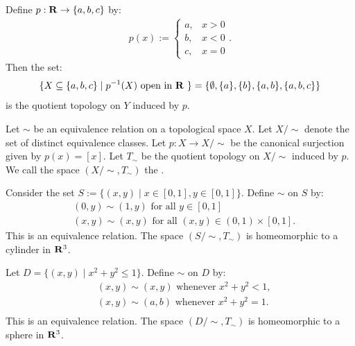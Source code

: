 \begin{example}
    Define $p:\mathbf{R} \rightarrow \{a,b,c\}$ by:
        \begin{equation*}
        \begin{split}
            p(x):=\begin{cases}
            a,& x>0 \\
            b,& x < 0 \\
            c,& x = 0
            \end{cases}.
        \end{split}
        \end{equation*}
    Then the set:
        \begin{equation*}
        \begin{split}
            \{X \subseteq \{a,b,c\} \mid p^{-1}(X) \text{ open in $\mathbf{R}$ }\}=\{\emptyset, \{a\}, \{b\}, \{a,b\},\{a,b,c\}\}
        \end{split}
        \end{equation*}
    is the quotient topology on $Y$ induced by $p$.
\end{example}

\begin{definition}
    Let $\sim$ be an equivalence relation on a topological space $X$. Let $X /\sim$ denote the set of distinct equivalence classes. Let $p:X \rightarrow X/\sim$ be the canonical surjection given by $p(x) = [x]$. Let $T_\sim$ be the quotient topology on $X /\sim$ induced by $p$. We call the space $(X/\sim,T_\sim)$ the .
\end{definition}

\begin{example}
    Consider the set $S := \{(x,y) \mid x \in [0,1], y \in [0,1]\}$. Define $\sim$ on $S$ by:
        \begin{equation*}
        \begin{split}
            &(0,y) \sim (1,y) \text{ for all } y \in [0,1] \\
            &(x,y) \sim (x,y) \text{ for all }(x,y) \in (0,1) \times [0,1].
        \end{split}
        \end{equation*}
        This is an equivalence relation. The space $(S/\sim, T_\sim)$ is homeomorphic to a cylinder in $\mathbf{R}^3$.
\end{example}

\begin{example}
    Let $D = \{(x,y) \mid x^2 + y^2 \leq 1\}$. Define $\sim$ on $D$ by:
        \begin{equation*}
        \begin{split}
            &(x,y) \sim (x,y) \text{ whenever }x^2 + y^2 < 1,\\
            &(x,y) \sim (a,b) \text{ whenever }x^2 + y^2 = 1.\\
        \end{split}
        \end{equation*}
    This is an equivalence relation. The space $(D/\sim, T_\sim)$ is homeomorphic to a sphere in $\mathbf{R}^3$.
\end{example}

